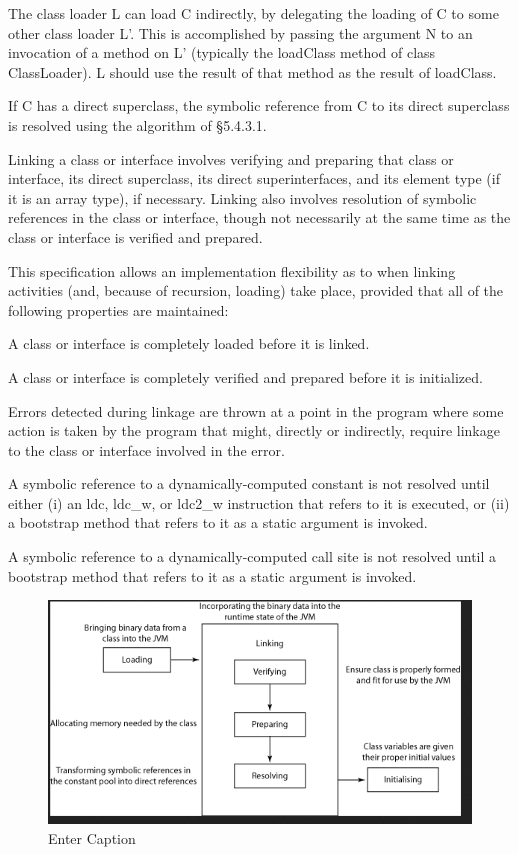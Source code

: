     The class loader L can load C indirectly, by delegating the loading of C to some other class loader L'. This is accomplished by passing the argument N to an invocation of a method on L' (typically the loadClass method of class ClassLoader). L should use the result of that method as the result of loadClass.

If C has a direct superclass, the symbolic reference from C to its direct superclass is resolved using the algorithm of §5.4.3.1. 

Linking a class or interface involves verifying and preparing that class or interface, its direct superclass, its direct superinterfaces, and its element type (if it is an array type), if necessary. Linking also involves resolution of symbolic references in the class or interface, though not necessarily at the same time as the class or interface is verified and prepared. 

This specification allows an implementation flexibility as to when linking activities (and, because of recursion, loading) take place, provided that all of the following properties are maintained:

    A class or interface is completely loaded before it is linked.

    A class or interface is completely verified and prepared before it is initialized.

    Errors detected during linkage are thrown at a point in the program where some action is taken by the program that might, directly or indirectly, require linkage to the class or interface involved in the error.

    A symbolic reference to a dynamically-computed constant is not resolved until either (i) an ldc, ldc_w, or ldc2_w instruction that refers to it is executed, or (ii) a bootstrap method that refers to it as a static argument is invoked.

    A symbolic reference to a dynamically-computed call site is not resolved until a bootstrap method that refers to it as a static argument is invoked.


\begin{figure}
    \centering
    \includegraphics[width=1\linewidth]{resources/class_loading.png}
    \caption{Enter Caption}
    \label{fig:enter-label}
\end{figure}
